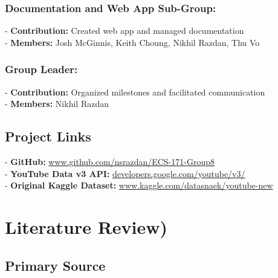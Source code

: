 \documentclass{article}
\begin{document}
\subsubsection*{Documentation and Web App Sub-Group:}
- \textbf{Contribution:} Created web app and managed documentation \\
- \textbf{Members:} Josh McGinnis, Keith Choung, Nikhil Razdan, Thu Vo
\subsubsection*{Group Leader:}
- \textbf{Contribution:} Organized milestones and facilitated communication \\
- \textbf{Members:} Nikhil Razdan

\subsection*{Project Links}
- \textbf{GitHub:} \url{www.github.com/nsrazdan/ECS-171-Group8} \\
- \textbf{YouTube Data v3 API:} \url{developers.google.com/youtube/v3/} \\
- \textbf{Original Kaggle Dataset:} \url{www.kaggle.com/datasnaek/youtube-new} \\

\section*{Literature Review)}
\subsection*{Primary Source}
\end{document}
